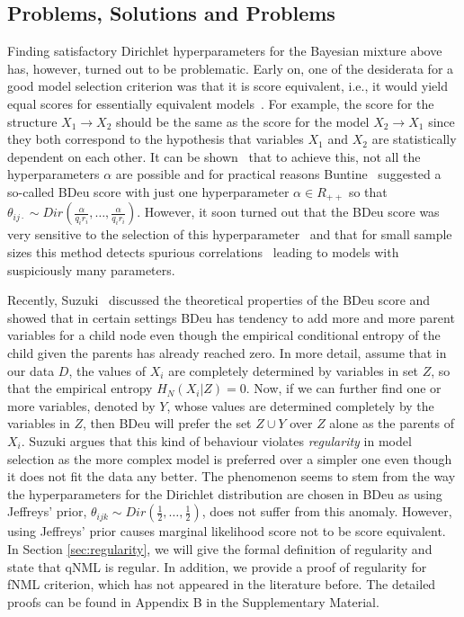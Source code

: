 \subsection {Problems, Solutions and Problems}

Finding satisfactory Dirichlet hyperparameters for the Bayesian
mixture above has, however, turned out to be problematic. Early on,
one of the desiderata for a good model selection criterion was that it
is score equivalent, i.e., it would yield equal scores for
essentially equivalent models~\cite{Verm90}.  For example, the score
for the structure $X_1\rightarrow X_2$ should be the same as the score
for the model $X_2 \rightarrow X_1$ since they both correspond to the
hypothesis that variables $X_1$ and $X_2$ are statistically dependent
on each other.  It can be shown~\cite{Heck95} that to achieve this,
not all the hyperparameters $\alpha$ are possible and for practical
reasons Buntine~\cite{Bunt91} suggested a so-called BDeu score with
just one hyperparameter $\alpha\in R_{++}$ so that
$\theta_{ij\cdot}\sim Dir(\frac{\alpha}{q_i
  r_i},\ldots,\frac{\alpha}{q_i r_i})$.  However, it soon turned out
that the BDeu score was very sensitive to the selection of this
hyperparameter~\cite{cosco.uai07} and that for small sample sizes this
method detects spurious correlations~\cite{Steck08} leading to models
with suspiciously many parameters.

Recently, Suzuki~\cite{Suzuki2017} discussed the theoretical
properties of the BDeu score and showed that in certain settings BDeu
has tendency to add more and more parent variables for a child node
even though the empirical conditional entropy of the child given the
parents has already reached zero. In more detail, assume that in our
data $D$, the values of $X_i$ are completely determined by variables
in set $Z$, so that the empirical entropy $H_N(X_i | Z) = 0$. Now, if we can further
find one or more variables, denoted by $Y$, whose values are
determined completely by the variables in $Z$, then BDeu will prefer
the set $Z\cup Y$ over $Z$ alone as the parents of $X_i$. Suzuki
argues that this kind of behaviour violates \textit{regularity} in model
selection as the more complex model is preferred over a simpler one
even though it does not fit the data any better. The phenomenon seems
to stem from the way the hyperparameters for the Dirichlet
distribution are chosen in BDeu as using Jeffreys' prior,
$\theta_{ijk}\sim Dir(\frac{1}{2},\ldots,\frac{1}{2})$, does not suffer
from this anomaly. However, using Jeffreys' prior causes marginal
likelihood score not to be score equivalent. In Section \ref{sec:regularity}, we will give the formal definition of regularity and state that qNML is regular. In addition, we provide a proof of regularity for fNML criterion, which has not appeared in the literature before. The detailed proofs can be found in Appendix B in the Supplementary Material.     

